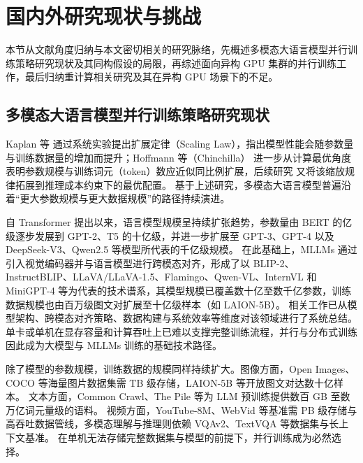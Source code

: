 \section{国内外研究现状与挑战}

本节从文献角度归纳与本文密切相关的研究脉络，先概述多模态大语言模型并行训练策略研究现状及其同构假设的局限，再综述面向异构 GPU 集群的并行训练工作，最后归纳重计算相关研究及其在异构 GPU 场景下的不足。

\subsection{多模态大语言模型并行训练策略研究现状}

Kaplan 等\cite{kaplan2020scaling} 通过系统实验提出扩展定律（Scaling Law），指出模型性能会随参数量与训练数据量的增加而提升；Hoffmann 等（Chinchilla）\cite{chinchilla2022} 进一步从计算最优角度表明参数规模与训练词元（token）数应近似同比例扩展，后续研究\cite{beyond_chinchilla2024} 又将该缩放规律拓展到推理成本约束下的最优配置。
基于上述研究，多模态大语言模型普遍沿着“更大参数规模与更大数据规模”的路径持续演进。

自 Transformer\cite{vaswani2017} 提出以来，语言模型规模呈持续扩张趋势，参数量由 BERT\cite{bert} 的亿级逐步发展到 GPT-2\cite{gpt2}、T5\cite{t5} 的十亿级，并进一步扩展至 GPT-3\cite{brown2020gpt3}、GPT-4\cite{openai2023} 以及 DeepSeek-V3\cite{deepseek2024}、Qwen2.5\cite{qwen2024} 等模型所代表的千亿级规模。
在此基础上，MLLMs 通过引入视觉编码器并与语言模型进行跨模态对齐，形成了以 BLIP-2\cite{blip2}、InstructBLIP\cite{instructblip2023}、LLaVA/LLaVA-1.5\cite{llava2023,llava15_2023}、Flamingo\cite{flamingo2022}、Qwen-VL\cite{qwenvl2023}、InternVL\cite{internvl2024} 和 MiniGPT-4\cite{minigpt4} 等为代表的技术谱系，其模型规模已覆盖数十亿至数千亿参数，训练数据规模也由百万级图文对扩展至十亿级样本（如 LAION-5B\cite{laion5b2022}）。
相关工作已从模型架构、跨模态对齐策略、数据构建与系统效率等维度对该领域进行了系统总结\cite{mllm_survey_acl2024,comprehensive_mllm_survey2024,mllm_datacentric2024}。
单卡或单机在显存容量和计算吞吐上已难以支撑完整训练流程\cite{megatron2021,megatron2020}，并行与分布式训练因此成为大模型与 MLLMs 训练的基础技术路径\cite{zero2020,zero2021}。

除了模型的参数规模，训练数据的规模同样持续扩大。图像方面，Open Images\cite{open_images}、COCO\cite{coco2014} 等海量图片数据集需 TB 级存储，LAION-5B 等开放图文对达数十亿样本。
文本方面，Common Crawl、The Pile\cite{pile2020} 等为 LLM 预训练提供数百 GB 至数万亿词元量级的语料。
视频方面，YouTube-8M\cite{youtube8m}、WebVid\cite{webvid2021} 等基准需 PB 级存储与高吞吐数据管线，多模态理解与推理则依赖 VQAv2\cite{vqav2}、TextVQA\cite{textvqa2019} 等数据集与长上下文基准\cite{long_context_benchmark2024}。
在单机无法存储完整数据集与模型的前提下，并行训练成为必然选择。

